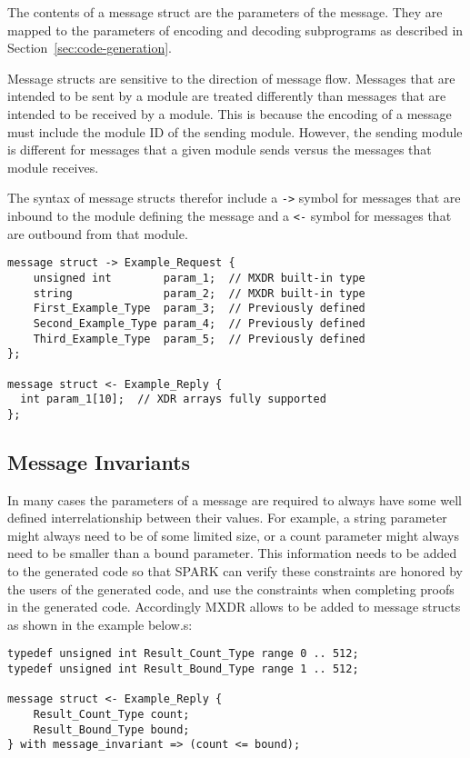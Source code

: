 The contents of a message struct are the parameters of the message. They are mapped to the
parameters of encoding and decoding subprograms as described in
Section~\ref{sec:code-generation}. 

Message structs are sensitive to the direction of message flow. Messages that are intended to be
sent by a module are treated differently than messages that are intended to be received by a
module. This is because the encoding of a message must include the module ID of the sending
module. However, the sending module is different for messages that a given module sends versus
the messages that module receives.

The syntax of message structs therefor include a \texttt{->} symbol for messages that are
inbound to the module defining the message and a \texttt{<-} symbol for messages that are
outbound from that module.

\begin{Verbatim}
message struct -> Example_Request {
    unsigned int        param_1;  // MXDR built-in type
    string              param_2;  // MXDR built-in type
    First_Example_Type  param_3;  // Previously defined
    Second_Example_Type param_4;  // Previously defined
    Third_Example_Type  param_5;  // Previously defined
};

message struct <- Example_Reply {
  int param_1[10];  // XDR arrays fully supported
};
\end{Verbatim}

\subsection{Message Invariants}

In many cases the parameters of a message are required to always have some well defined
interrelationship between their values. For example, a string parameter might always need to be
of some limited size, or a count parameter might always need to be smaller than a bound
parameter. This information needs to be added to the generated code so that SPARK can verify
these constraints are honored by the users of the generated code, and use the constraints when
completing proofs in the generated code. Accordingly MXDR allows  to
be added to message structs as shown in the example below.s:

\begin{Verbatim}
typedef unsigned int Result_Count_Type range 0 .. 512;
typedef unsigned int Result_Bound_Type range 1 .. 512;

message struct <- Example_Reply {
    Result_Count_Type count;
    Result_Bound_Type bound;
} with message_invariant => (count <= bound);
\end{Verbatim}


